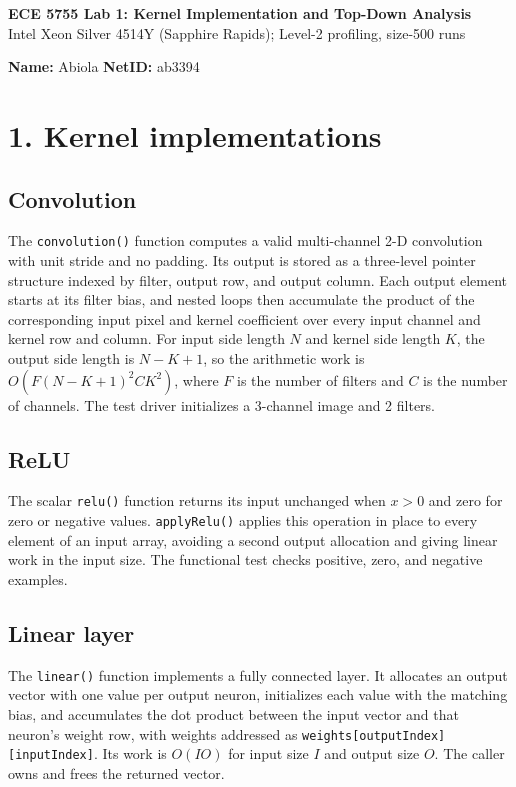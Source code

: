 \documentclass[10pt]{article}
\begin{document}
\begin{center}
{\Large\textbf{ECE 5755 Lab 1: Kernel Implementation and Top-Down Analysis}}\\[-2pt]
\small Intel Xeon Silver 4514Y (Sapphire Rapids); Level-2 profiling, size-500 runs
\end{center}

\textbf{Name:} Abiola \hfill
\textbf{NetID:} ab3394

\section*{1. Kernel implementations}

\subsection*{Convolution}
The \texttt{convolution()} function computes a valid multi-channel 2-D convolution with unit stride and no padding. Its output is stored as a three-level pointer structure indexed by filter, output row, and output column. Each output element starts at its filter bias, and nested loops then accumulate the product of the corresponding input pixel and kernel coefficient over every input channel and kernel row and column. For input side length $N$ and kernel side length $K$, the output side length is $N-K+1$, so the arithmetic work is $O(F(N-K+1)^2CK^2)$, where $F$ is the number of filters and $C$ is the number of channels. The test driver initializes a 3-channel image and 2 filters.

\subsection*{ReLU}
The scalar \texttt{relu()} function returns its input unchanged when $x>0$ and zero for zero or negative values. \texttt{applyRelu()} applies this operation in place to every element of an input array, avoiding a second output allocation and giving linear work in the input size. The functional test checks positive, zero, and negative examples.

\subsection*{Linear layer}
The \texttt{linear()} function implements a fully connected layer. It allocates an output vector with one value per output neuron, initializes each value with the matching bias, and accumulates the dot product between the input vector and that neuron's weight row, with weights addressed as \texttt{weights[outputIndex][inputIndex]}. Its work is $O(I O)$ for input size $I$ and output size $O$. The caller owns and frees the returned vector.
\end{document}
